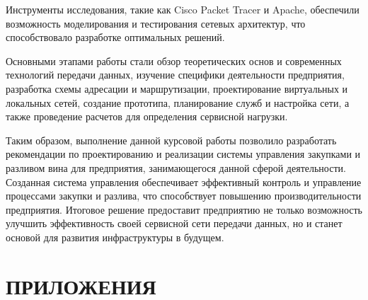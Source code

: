 Инструменты исследования, такие как Cisco Packet Tracer и Apache, обеспечили возможность моделирования и тестирования сетевых архитектур, что способствовало разработке оптимальных решений.

Основными этапами работы стали обзор теоретических основ и современных технологий передачи данных, изучение специфики деятельности предприятия, разработка схемы адресации и маршрутизации, проектирование виртуальных и локальных сетей, создание прототипа, планирование служб и настройка сети, а также проведение расчетов для определения сервисной нагрузки.

Таким образом, выполнение данной курсовой работы позволило разработать рекомендации по проектированию и реализации системы управления закупками и разливом вина для предприятия, занимающегося данной сферой деятельности. Созданная система управления обеспечивает эффективный контроль и управление процессами закупки и разлива, что способствует повышению производительности предприятия. Итоговое решение предоставит предприятию не только возможность улучшить эффективность своей сервисной сети передачи данных, но и станет основой для развития инфраструктуры в будущем.

\begingroup
\let\itshape\upshape
\sloppy
\printbibliography[title=СПИСОК ИСПОЛЬЗУЕМЫХ ИСТОЧНИКОВ]
\endgroup


\clearpage
\section*{ПРИЛОЖЕНИЯ}


